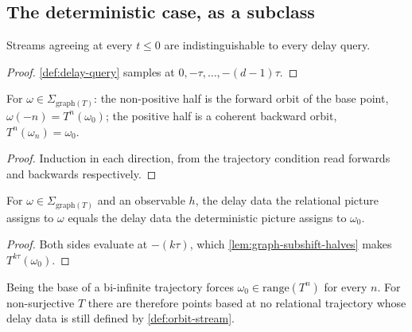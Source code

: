 \subsection{The deterministic case, as a subclass}

\begin{lemma}
  \label{lem:delay-nonpos}
  \leanok
  Streams agreeing at every $t \leq 0$ are indistinguishable to every delay
  query.
\end{lemma}

\begin{proof}
  \leanok
  \ref{def:delay-query} samples at $0, -\tau, \dots, -(d-1)\tau$.
\end{proof}

\begin{lemma}
  \label{lem:graph-subshift-halves}
  \leanok
  For $\omega \in \Sigma_{\mathrm{graph}(T)}$: the non-positive half is the
  forward orbit of the base point, $\omega(-n) = T^n(\omega_0)$; the positive
  half is a coherent backward orbit, $T^n(\omega_n) = \omega_0$.
\end{lemma}

\begin{proof}
  \leanok
  Induction in each direction, from the trajectory condition read forwards and
  backwards respectively.
\end{proof}

\begin{theorem}
  \label{thm:deterministic-subclass}
  \leanok
  For $\omega \in \Sigma_{\mathrm{graph}(T)}$ and an observable $h$, the delay
  data the relational picture assigns to $\omega$ equals the delay data the
  deterministic picture assigns to $\omega_0$.
\end{theorem}

\begin{proof}
  \leanok
  Both sides evaluate at $-(k\tau)$, which \ref{lem:graph-subshift-halves} makes
  $T^{k\tau}(\omega_0)$.
\end{proof}

\begin{remark}
  \label{rmk:deterministic-residue}
  \leanok
  Being the base of a bi-infinite trajectory forces $\omega_0 \in
  \mathrm{range}(T^n)$ for every $n$. For non-surjective $T$ there are therefore
  points based at no relational trajectory whose delay data is still defined by
  \ref{def:orbit-stream}.
\end{remark}